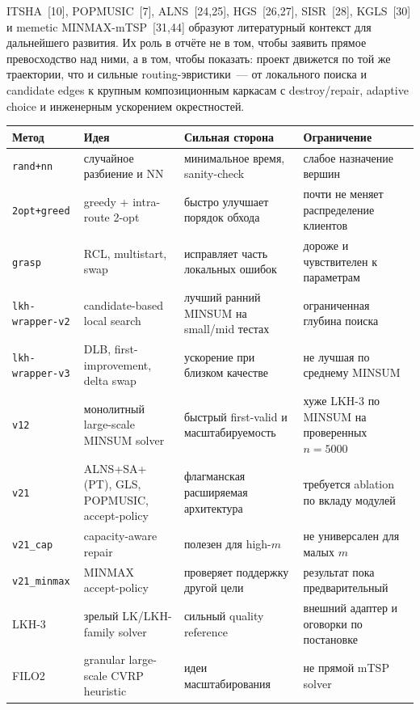 \documentclass[14pt,a4paper]{extarticle}
\newcommand{\source}[1]{[#1]}
\begin{document}
ITSHA~\source{10}, POPMUSIC~\source{7}, ALNS~\source{24,25}, HGS~\source{26,27}, SISR~\source{28}, KGLS~\source{30} и memetic MINMAX-mTSP~\source{31,44} образуют литературный контекст для дальнейшего развития. Их роль в отчёте не в том, чтобы заявить прямое превосходство над ними, а в том, чтобы показать: проект движется по той же траектории, что и сильные routing-эвристики~--- от локального поиска и candidate edges к крупным композиционным каркасам с destroy/repair, adaptive choice и инженерным ускорением окрестностей.

{\scriptsize\setlength{\tabcolsep}{2pt}
\begin{longtable}{>{\raggedright\arraybackslash}p{}>{\raggedright\arraybackslash}p{}>{\raggedright\arraybackslash}p{}>{\raggedright\arraybackslash}p{}}
\toprule
\textbf{Метод} & \textbf{Идея} & \textbf{Сильная сторона} & \textbf{Ограничение}\\
\midrule
\endhead
\texttt{rand+nn} & случайное разбиение и NN & минимальное время, sanity-check & слабое назначение вершин\\
\texttt{2opt+greed} & greedy + intra-route 2-opt & быстро улучшает порядок обхода & почти не меняет распределение клиентов\\
\texttt{grasp} & RCL, multistart, swap & исправляет часть локальных ошибок & дороже и чувствителен к параметрам\\
\texttt{lkh-wrapper-v2} & candidate-based local search & лучший ранний MINSUM на small/mid тестах & ограниченная глубина поиска\\
\texttt{lkh-wrapper-v3} & DLB, first-improvement, delta swap & ускорение при близком качестве & не лучшая по среднему MINSUM\\
\texttt{v12} & монолитный large-scale MINSUM solver & быстрый first-valid и масштабируемость & хуже LKH-3 по MINSUM на проверенных $n=5000$\\
\texttt{v21} & ALNS+SA+(PT), GLS, POPMUSIC, accept-policy & флагманская расширяемая архитектура & требуется ablation по вкладу модулей\\
\texttt{v21\_cap} & capacity-aware repair & полезен для high-$m$ & не универсален для малых $m$\\
\texttt{v21\_minmax} & MINMAX accept-policy & проверяет поддержку другой цели & результат пока предварительный\\
LKH-3 & зрелый LK/LKH-family solver & сильный quality reference & внешний адаптер и оговорки по постановке\\
FILO2 & granular large-scale CVRP heuristic & идеи масштабирования & не прямой mTSP solver\\
\bottomrule
\end{longtable}
}
\end{document}
